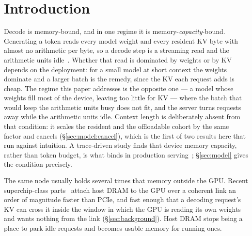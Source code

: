 
\section{Introduction}
\label{sec:intro}

Decode is memory-bound, and in one regime it is memory-\emph{capacity}-bound.
Generating a token reads every model weight and every resident KV byte with almost
no arithmetic per byte, so a decode step is a streaming read and the arithmetic units
idle~\cite{vllm,flashattention2}. Whether that read is dominated by weights or by KV
depends on the deployment: for a small model at short context the weights dominate
and a larger batch is the remedy, since the KV each request adds is cheap. The regime
this paper addresses is the opposite one --- a model whose weights fill most of the
device, leaving too little for KV --- where the batch that would keep the arithmetic
units busy does not fit, and the server turns requests away while the arithmetic
units idle. Context length is deliberately absent from that condition: it scales the
resident and the offloadable cohort by the same factor and cancels
(\S\ref{sec:model:cancel}), which is the first of two results here that run against
intuition. A trace-driven study finds that device memory capacity, rather than token
budget, is what binds in production serving~\cite{bottlenecks}; \S\ref{sec:model}
gives the condition precisely.

The same node usually holds several times that memory outside the GPU. Recent
superchip-class parts~\cite{gracehopper} attach host DRAM to the GPU over a coherent
link an order of magnitude faster than PCIe, and fast enough that a decoding
request's KV can cross it inside the window in which the GPU is reading its own
weights and wants nothing from the link (\S\ref{sec:background}). Host DRAM stops
being a place to park idle requests and becomes usable memory for running ones.

